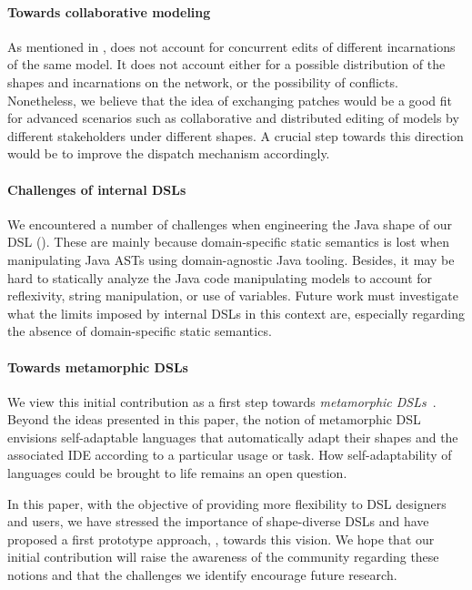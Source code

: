 \paragraph{Towards collaborative modeling}
As mentioned in , \prism does not account for concurrent edits of different incarnations of the same model.
It does not account either for a possible distribution of the shapes and incarnations on the network, or the possibility of conflicts.
Nonetheless, we believe that the idea of exchanging patches would be a good fit for advanced scenarios such as collaborative and distributed editing of models by different stakeholders under different shapes.
A crucial step towards this direction would be to improve the dispatch mechanism accordingly.

\paragraph{Challenges of internal DSLs}
We encountered a number of challenges when engineering the Java shape of our DSL ().
These are mainly because domain-specific static semantics is lost when manipulating Java ASTs using domain-agnostic Java tooling.
Besides, it may be hard to statically analyze the Java code manipulating models to account for reflexivity, string manipulation, or use of variables.
Future work must investigate what the limits imposed by internal DSLs in this context are, especially regarding the absence of domain-specific static semantics.


\paragraph{Towards metamorphic DSLs}
We view this initial contribution as a first step towards \emph{metamorphic DSLs}~\cite{acher2014metamorphic}.
Beyond the ideas presented in this paper, the notion of metamorphic DSL envisions self-adaptable languages that automatically adapt their shapes and the associated IDE according to a particular usage or task.
How self-adaptability of languages could be brought to life remains an open question.

\vspace{1em}
In this paper, with the objective of providing more flexibility to DSL designers and users, we have stressed the importance of shape-diverse DSLs and have proposed a first prototype approach, \prism, towards this vision.
We hope that our initial contribution will raise the awareness of the community regarding these notions and that the challenges we identify encourage future research.
